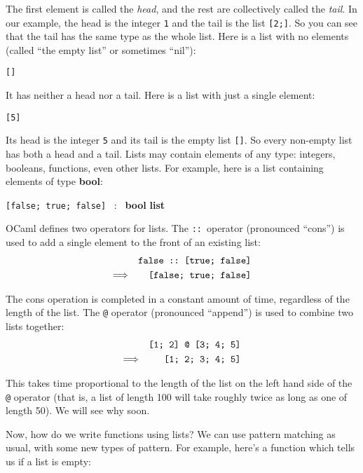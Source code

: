 \documentclass[]{book}
\newcommand{\smspace}{\vspace{4mm}}
\begin{document}
The first element is called the \textit{head}, and the rest are collectively called the \textit{tail}. In our example, the head is the integer \verb!1! and the tail is the list \texttt{[2;]}. So you can see that the tail has the same type as the whole list. Here is a list with no elements (called ``the empty list'' or sometimes ``nil''):

\smspace
\verb![]!
\smspace

\noindent It has neither a head nor a tail. Here is a list with just a single element:

\smspace
\verb![5]!
\smspace

\noindent Its head is the integer \texttt{5} and its tail is the empty list \texttt{[]}. So every non-empty list has both a head and a tail. Lists may contain elements of any type: integers, booleans, functions, even other lists. For example, here is a list containing elements of type \textbf{\textsf{bool}}:

\smspace
\texttt{[false; true; false]} \ : \ \textsf{\textbf{bool}} \textsf{\textbf{list}}
\smspace

\noindent OCaml defines two operators for lists. The \texttt{::}\ operator (pronounced ``cons'') is used to add a single element to the front of an existing list:
\begin{eqnarray*}
 & & \verb!false :: [true; false]! \\
 \Longrightarrow & & \verb![false; true; false]!
\end{eqnarray*}

\noindent The cons operation is completed in a constant amount of time, regardless of the length of the list. The \texttt{@} operator (pronounced ``append'') is used to combine two lists together:
\begin{eqnarray*}
 & & \verb![1; 2] @ [3; 4; 5]! \\
 \Longrightarrow & & \verb![1; 2; 3; 4; 5]!
\end{eqnarray*}

\noindent This takes time proportional to the length of the list on the left hand side of the \texttt{@} operator (that is, a list of length 100 will take roughly twice as long as one of length 50). We will see why soon.

Now, how do we write functions using lists? We can use pattern matching as usual, with some new types of pattern. For example, here's a function which tells us if a list is empty:
\end{document}
